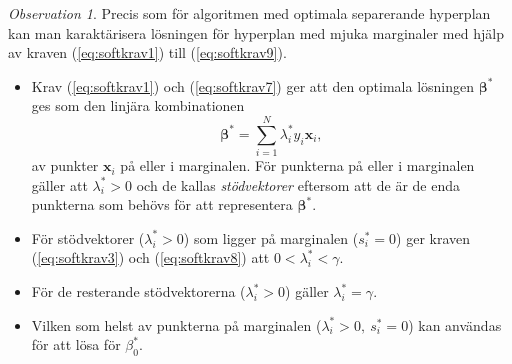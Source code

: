 \documentclass[a4paper, 12pt]{report}
\theoremstyle{definition}
\theoremstyle{remark}
\newtheorem*{rem}{Observation}
\newcommand{\bfbeta}{{\boldsymbol{\beta}}}
\begin{document}
\begin{rem}
	Precis som för algoritmen med optimala separerande hyperplan kan man karaktärisera lösningen för hyperplan med mjuka marginaler med hjälp av kraven (\ref{eq:softkrav1}) till (\ref{eq:softkrav9}).
	\begin{itemize}
		\item Krav (\ref{eq:softkrav1}) och (\ref{eq:softkrav7}) ger att den optimala lösningen $\bfbeta^*$ ges som den linjära kombinationen
		\begin{equation*}
			\bfbeta^* = \sum_{i=1}^{N}\lambda_i^*y_i\mathbf{x}_i,
		\end{equation*}
		av punkter $\mathbf{x}_i$ på eller i marginalen. För punkterna på eller i marginalen gäller att $\lambda^*_i>0$ och de kallas \emph{stödvektorer} eftersom att de är de enda punkterna som behövs för att representera $\bfbeta^*$.
		\item För stödvektorer ($\lambda^*_i>0$) som ligger på marginalen ($s_i^*=0$) ger kraven (\ref{eq:softkrav3}) och (\ref{eq:softkrav8}) att $0<\lambda_i^*<\gamma$.
		\item För de resterande stödvektorerna ($\lambda_i^*>0$) gäller $\lambda_i^*=\gamma$.
		\item Vilken som helst av punkterna på marginalen ($\lambda^*_i>0,~s^*_i=0$) kan användas för att lösa för $\beta_0^*$.
	\end{itemize}
\end{rem}
\end{document}
